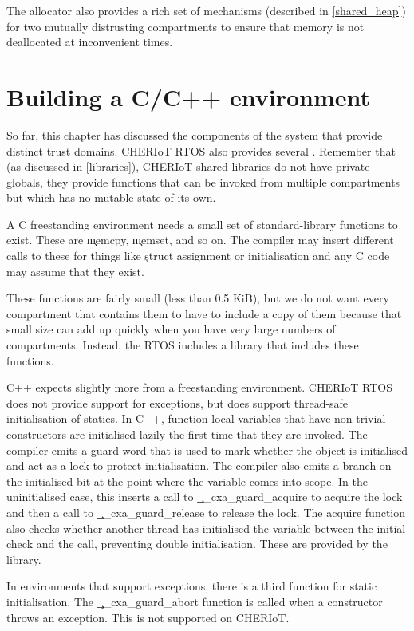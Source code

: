 The allocator also provides a rich set of mechanisms (described in \ref{shared_heap}) for two mutually distrusting compartments to ensure that memory is not deallocated at inconvenient times.

\section{Building a C/C++ environment}

So far, this chapter has discussed the components of the system that provide distinct trust domains.
CHERIoT RTOS also provides several .
Remember that (as discussed in \ref{libraries}), CHERIoT shared libraries do not have private globals, they provide functions that can be invoked from multiple compartments but which has no mutable state of its own.

A C freestanding environment needs a small set of standard-library functions to exist.
These are \c{memcpy}, \c{memset}, and so on.
The compiler may insert different calls to these for things like \c{struct} assignment or initialisation and any C code may assume that they exist.

These functions are fairly small (less than 0.5 KiB), but we do not want every compartment that contains them to have to include a copy of them because that small size can add up quickly when you have very large numbers of compartments.
Instead, the RTOS includes a  library that includes these functions.

C++ expects slightly more from a freestanding environment.
CHERIoT RTOS does not provide support for exceptions, but does support thread-safe initialisation of statics.
In C++, function-local  variables that have non-trivial constructors are initialised lazily the first time that they are invoked.
The compiler emits a guard word that is used to mark whether the object is initialised and act as a lock to protect initialisation.
The compiler also emits a branch on the initialised bit at the point where the variable comes into scope.
In the uninitialised case, this inserts a call to \c{__cxa_guard_acquire} to acquire the lock and then a call to \c{__cxa_guard_release} to release the lock.
The acquire function also checks whether another thread has initialised the variable between the initial check and the call, preventing double initialisation.
These are provided by the  library.

\begin{note}
In environments that support exceptions, there is a third function for static initialisation.
The \c{__cxa_guard_abort} function is called when a constructor throws an exception.
This is not supported on CHERIoT.
\end{note}


